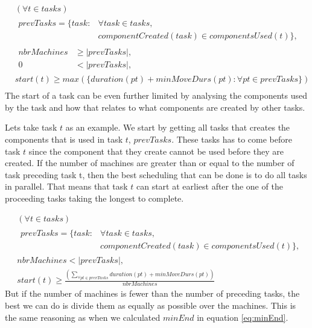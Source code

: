  \begin{equation}
 \begin{aligned}\label{eq:70}
 &(\forall t \in tasks)\\
 &\begin{aligned}
 prevTasks = \{task : &\forall task \in tasks,\\
 &componentCreated(task) \in componentsUsed(t)\},
 \end{aligned}\\
 &\begin{aligned}
 nbrMachines &\ge |prevTasks|,\\
 0 &< |prevTasks|,
 \end{aligned}\\
 &start(t) \ge max(\{duration(pt) + minMoveDurs(pt) : \forall pt \in prevTasks\}) \\
 \end{aligned}
 \end{equation}
 The start of a task can be even further limited by analysing the components used by the task and how that relates to what components are created by other tasks.
 
 Lets take task $t$ as an example. We start by getting all tasks that creates the components that is used in task $t$, $prevTasks$. These tasks has to come before task $t$ since the component that they create cannot be used before they are created. If the number of machines are greater than or equal to the number of task preceding task t, then the best scheduling that can be done is to do all tasks in parallel. That means that task $t$ can start at earliest after the one of the proceeding tasks taking the longest to complete.
 
 \begin{equation}
 \begin{aligned}\label{eq:71}
 &(\forall t \in tasks) \\
 &\begin{aligned}
 prevTasks = \{task : &\forall task \in tasks,\\
 &componentCreated(task) \in componentsUsed(t)\},
 \end{aligned} \\
 &nbrMachines < |prevTasks|,  \\
 &start(t) \ge \frac{\left(\sum_{\forall pt \in prevTasks}duration(pt) + minMoveDurs(pt)\right)}{nbrMachines}
 \end{aligned}
 \end{equation}
 But if the number of machines is fewer than the number of preceding tasks, the best we can do is divide them as equally as possible over the machines. This is the same reasoning as when we calculated $minEnd$ in equation \ref{eq:minEnd}.
 
